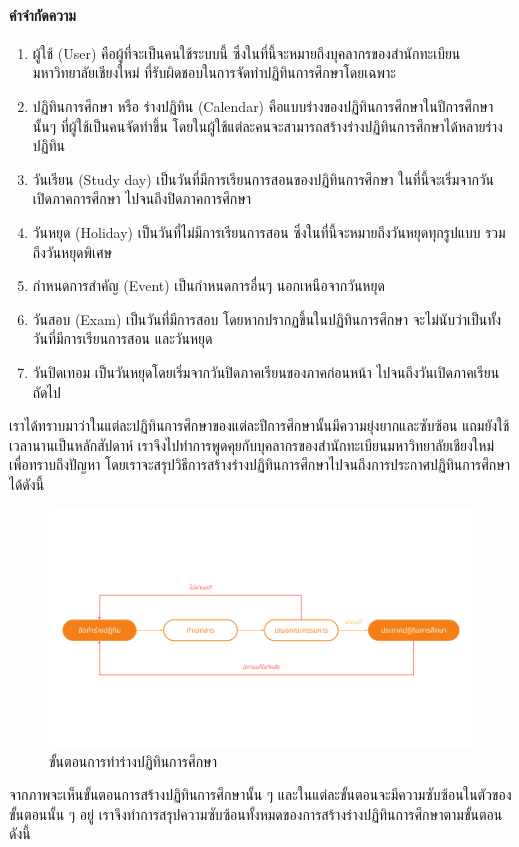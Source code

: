 \paragraph{คำจำกัดความ}
\begin{enumerate}
    \item ผู้ใช้ (User) คือผู้ที่จะเป็นคนใช้ระบบนี้ ซึ่งในที่นี้จะหมายถึงบุคลากรของสำนักทะเบียนมหาวิทยาลัยเชียงใหม่ ที่รับผิดชอบในการจัดทำปฏิทินการศึกษาโดยเฉพาะ
    \item ปฏิทินการศึกษา หรือ ร่างปฏิทิน (Calendar) คือแบบร่างของปฏิทินการศึกษาในปีการศึกษานั้นๆ ที่ผู้ใช้เป็นคนจัดทำขึ้น โดยในผู้ใช้แต่ละคนจะสามารถสร้างร่างปฏิทินการศึกษาได้หลายร่างปฏิทิน
    \item วันเรียน (Study day) เป็นวันที่มีการเรียนการสอนของปฏิทินการศึกษา ในที่นี้จะเริ่มจากวันเปิดภาคการศึกษา ไปจนถึงปิดภาคการศึกษา
    \item วันหยุด (Holiday) เป็นวันที่ไม่มีการเรียนการสอน ซึ่งในที่นี้จะหมายถึงวันหยุดทุกรูปแบบ รวมถึงวันหยุดพิเศษ
    \item กำหนดการสำคัญ (Event) เป็นกำหนดการอื่นๆ นอกเหนือจากวันหยุด
    \item วันสอบ (Exam) เป็นวันที่มีการสอบ โดยหากปรากฏขึ้นในปฏิทินการศึกษา จะไม่นับว่าเป็นทั้งวันที่มีการเรียนการสอน และวันหยุด
    \item วันปิดเทอม เป็นวันหยุดโดยเริ่มจากวันปิดภาคเรียนของภาคก่อนหน้า ไปจนถึงวันเปิดภาคเรียนถัดไป
\end{enumerate}

เราได้ทราบมาว่าในแต่ละปฏิทินการศึกษาของแต่ละปีการศึกษานั้นมีความยุ่งยากและซับซ้อน แถมยังใช้เวลานานเป็นหลักสัปดาห์ เราจึงไปทำการพูดคุยกับบุคลากรของสำนักทะเบียนมหาวิทยาลัยเชียงใหม่เพื่อทราบถึงปัญหา โดยเราจะสรุปวิธีการสร้างร่างปฏิทินการศึกษาไปจนถึงการประกาศปฏิทินการศึกษาได้ดังนี้

\begin{figure}[htbp]
    \centering
    \includegraphics[width=1\textwidth]{create-draft.png}
    \caption{ขั้นตอนการทำร่างปฏิทินการศึกษา}
    \label{fig:user-flow-create-draft}
\end{figure}
จากภาพจะเห็นขั้นตอนการสร้างปฏิทินการศึกษานั้น ๆ และในแต่ละขั้นตอนจะมีความซับซ้อนในตัวของขั้นตอนนั้น ๆ อยู่ เราจึงทำการสรุปความซับซ้อนทั้งหมดของการสร้างร่างปฏิทินการศึกษาตามขั้นตอนดังนี้

